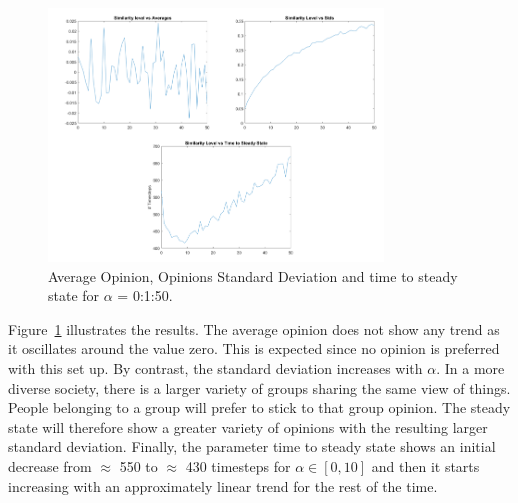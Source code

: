 \begin{figure}[!t]
	\centering
	\includegraphics[width=3.5in]{Figures/diversity_results.png}
	\caption{Average Opinion, Opinions Standard Deviation and time to steady state for $\alpha$ = 0:1:50.}
	\label{pics:diversityresults}
\end{figure}
Figure~\ref{pics:diversityresults} illustrates the results. The average opinion does not show any trend as it oscillates around the value zero. This is expected since no opinion is preferred with this set up. By contrast, the standard deviation increases with $\alpha$. In a more diverse society, there is a larger variety of groups sharing the same view of things. People belonging to a group will prefer to stick to that group opinion. The steady state will therefore show a greater variety of opinions with the resulting larger standard deviation. Finally, the parameter time to steady state shows an initial decrease from $\approx$ 550 to $\approx$ 430 timesteps for $\alpha \in [0,10]$ and then it starts increasing with an approximately linear trend for the rest of the time. 

